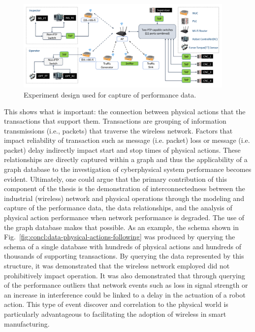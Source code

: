 \begin{figure}[!ht]
	\centering
	\includegraphics[width=0.95\textwidth]{chapter-gdb-appl/figures/Fig1TiiSpecialDiagram-testbed2.png}
	\caption{Experiment design used for capture of performance data.}
	\label{fig:concl:experiment-design}
\end{figure}

This shows what is important: the connection between physical actions that the transactions that support them.  Transactions are grouping of information transmissions (i.e., packets) that traverse the wireless network.  Factors that impact reliability of transaction such as message (i.e. packet) loss or message (i.e. packet) delay indirectly impact start and stop times of physical actions.  These relationships are directly captured within a graph and thus the applicability of a graph database to the investigation of cyberphysical system performance becomes evident.  Ultimately, one could argue that the primary contribution of this component of the thesis is the demonstration of interconnectedness between the industrial (wireless) network and physical operations through the modeling and capture of the performance data, the data relationships, and the analysis of physical action performance when network performance is degraded.  The use of the graph database makes that possible.  As an example, the schema shown in Fig.~\ref{fig:concl:data-physical-actions-following} was produced by querying the schema of a single database with hundreds of physical actions and hundreds of thousands of supporting transactions.  By querying the data represented by this structure, it was demonstrated that the wireless network employed did not prohibitively impact operation.  It was also demonstrated that through querying of the performance outliers that network events such as loss in signal strength or an increase in interference could be linked to a delay in the actuation of a robot action.  This type of event discover and correlation to the physical world is particularly advantageous to facilitating the adoption of wireless in smart manufacturing.

